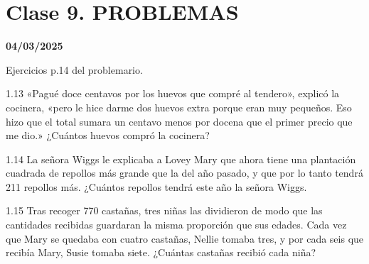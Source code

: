 \chapter{Clase 9. PROBLEMAS}
\textbf{04/03/2025}

Ejercicios p.14 del problemario.
\begin{excercise}
    1.13 «Pagué doce centavos por los huevos que compré al tendero», explicó la cocinera, «pero le hice darme dos huevos extra porque eran muy pequeños. Eso hizo que el total sumara un centavo menos por docena que el primer precio que me dio.» ¿Cuántos huevos compró la cocinera?
\end{excercise}

\begin{excercise}
    1.14 La señora Wiggs le explicaba a Lovey Mary que ahora tiene una plantación cuadrada de repollos más grande que la del año pasado, y que por lo tanto tendrá 211 repollos más. ¿Cuántos repollos tendrá este año la señora Wiggs.
\end{excercise}

\begin{excercise}
    1.15 Tras recoger 770 castañas, tres niñas las dividieron de modo que las cantidades recibidas guardaran la misma proporción que sus edades. Cada vez que Mary se quedaba con cuatro castañas, Nellie tomaba tres, y por cada seis que recibía Mary, Susie tomaba siete. ¿Cuántas castañas recibió cada niña?
\end{excercise}
